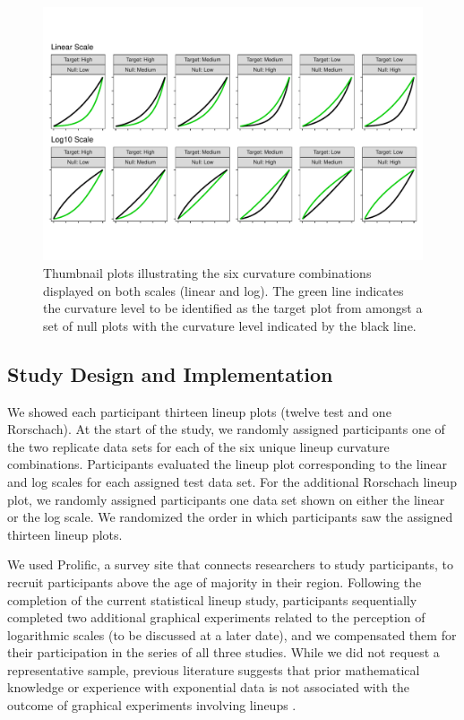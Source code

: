\documentclass[12pt]{article}
\begin{document}
\begin{figure}[tbp]

{\centering \includegraphics[width=1\linewidth,]{logarithmic-lineups_files/figure-latex/curvature-combination-example-1} 

}

\caption[Lineup curvature combinations]{Thumbnail plots illustrating the six curvature combinations displayed on both scales (linear and log). The green line indicates the curvature level to be identified as the target plot from amongst a set of null plots with the curvature level indicated by the black line.}\label{fig:curvature-combination-example}
\end{figure}

\hypertarget{study-design-and-implementation}{%
\subsection{Study Design and
Implementation}\label{study-design-and-implementation}}

We showed each participant thirteen lineup plots (twelve test and one
Rorschach). At the start of the study, we randomly assigned participants
one of the two replicate data sets for each of the six unique lineup
curvature combinations. Participants evaluated the lineup plot
corresponding to the linear and log scales for each assigned test data
set. For the additional Rorschach lineup plot, we randomly assigned
participants one data set shown on either the linear or the log scale.
We randomized the order in which participants saw the assigned thirteen
lineup plots.

We used Prolific, a survey site that connects researchers to study
participants, to recruit participants above the age of majority in their
region. Following the completion of the current statistical lineup
study, participants sequentially completed two additional graphical
experiments related to the perception of logarithmic scales (to be
discussed at a later date), and we compensated them for their
participation in the series of all three studies. While we did not
request a representative sample, previous literature suggests that prior
mathematical knowledge or experience with exponential data is not
associated with the outcome of graphical experiments involving lineups
\citep{vanderplas2015spatial}.
\end{document}
